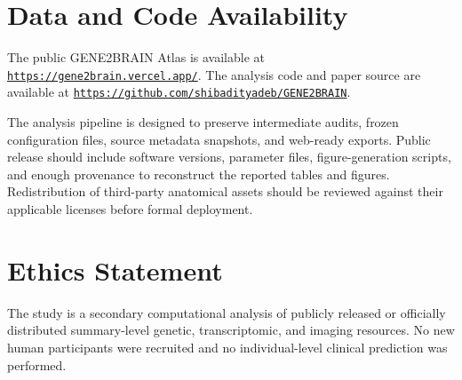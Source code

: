 \documentclass[10pt,twocolumn]{article}
\begin{document}
\section*{Data and Code Availability}

The public GENE2BRAIN Atlas is available at \href{https://gene2brain.vercel.app/}{\texttt{https://gene2brain.vercel.app/}}. The analysis code and paper source are available at \href{https://github.com/shibadityadeb/GENE2BRAIN}{\texttt{https://github.com/shibadityadeb/GENE2BRAIN}}.

The analysis pipeline is designed to preserve intermediate audits, frozen configuration files, source metadata snapshots, and web-ready exports. Public release should include software versions, parameter files, figure-generation scripts, and enough provenance to reconstruct the reported tables and figures. Redistribution of third-party anatomical assets should be reviewed against their applicable licenses before formal deployment.

\section*{Ethics Statement}

The study is a secondary computational analysis of publicly released or officially distributed summary-level genetic, transcriptomic, and imaging resources. No new human participants were recruited and no individual-level clinical prediction was performed.
\end{document}
